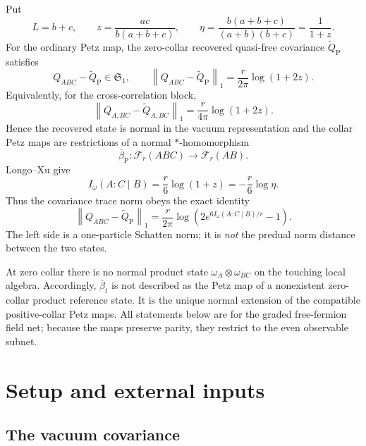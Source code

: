 \documentclass[11pt]{article}
\theoremstyle{accent}
\theoremstyle{definition}
\newcommand{\cF}{\mathcal{F}}
\newcommand{\Sone}{\mathfrak{S}_1}
\newcommand{\CMI}{I}
\newcommand{\norm}[1]{\left\lVert #1\right\rVert}
\begin{document}
\begin{mainbox}
Put
\[
 L=b+c,\qquad z=\frac{ac}{b(a+b+c)},\qquad
 \eta=\frac{b(a+b+c)}{(a+b)(b+c)}=\frac1{1+z}.
\]
For the ordinary Petz map, the zero-collar recovered quasi-free covariance \(\widetilde Q_{\mathrm P}\) satisfies
\[
 Q_{ABC}-\widetilde Q_{\mathrm P}\in\Sone,
 \qquad
 \boxed{
 \norm{Q_{ABC}-\widetilde Q_{\mathrm P}}_1
 =\frac{r}{2\pi}\log(1+2z).
 }
\]
Equivalently, for the cross-correlation block,
\[
 \boxed{
 \norm{Q_{A,BC}-\widetilde Q_{A,BC}}_1
 =\frac{r}{4\pi}\log(1+2z).
 }
\]
Hence the recovered state is normal in the vacuum representation and the collar Petz maps are restrictions of a normal \(*\)-homomorphism
\[
 \overline\beta_{\mathrm P}:\cF_r(ABC)\longrightarrow\cF_r(AB).
\]
Longo--Xu give
\[
 \CMI_\omega(A:C\mid B)=\frac r6\log(1+z)=-\frac r6\log\eta.
\]
Thus the covariance trace norm obeys the exact identity
\[
 \norm{Q_{ABC}-\widetilde Q_{\mathrm P}}_1
 =\frac{r}{2\pi}
 \log\!\left(2e^{6\CMI_\omega(A:C\mid B)/r}-1\right).
\]
The left side is a one-particle Schatten norm; it is \emph{not} the predual norm distance between the two states.
\end{mainbox}

\begin{caveatbox}
At zero collar there is no normal product state \(\omega_A\otimes\omega_{BC}\) on the touching local algebra.  Accordingly, \(\overline\beta_t\) is not described as the Petz map of a nonexistent zero-collar product reference state.  It is the unique normal extension of the compatible positive-collar Petz maps.  All statements below are for the graded free-fermion field net; because the maps preserve parity, they restrict to the even observable subnet.
\end{caveatbox}

\tableofcontents
\clearpage

\section{Setup and external inputs}

\subsection{The vacuum covariance}
\end{document}
